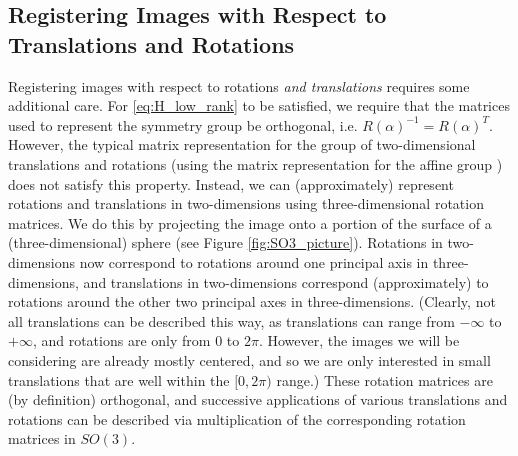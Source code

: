 \documentclass{pnastwo}
\begin{document}
\begin{article}
\begin{materials}
\section{Registering Images with Respect to Translations and Rotations} \label{subsec:trans_rot_register}

Registering images with respect to rotations {\em and translations} requires some additional care.
%
%
For \eqref{eq:H_low_rank} to be satisfied, we require that the matrices used to represent the symmetry group be orthogonal, i.e. $R(\alpha)^{-1} = R(\alpha)^T$. 
%
However, the typical matrix representation for the group of two-dimensional translations and rotations (using the matrix representation for the affine group \cite{...}) does not satisfy this property. 
%
Instead, we can (approximately) represent rotations and translations in two-dimensions using three-dimensional rotation matrices.
%
We do this by projecting the image onto a portion of the surface of a (three-dimensional) sphere (see Figure \ref{fig:SO3_picture}).
%
Rotations in two-dimensions now correspond to rotations around one principal axis in three-dimensions, and translations in two-dimensions correspond (approximately) to rotations around the other two principal axes in three-dimensions. (Clearly, not all translations can be described this way, as translations can range from $-\infty$ to $+ \infty$, and rotations are only from $0$ to $2 \pi$. However, the images we will be considering are already mostly centered, and so we are only interested in small translations that are well within the $[0, 2\pi)$ range.)
%
These rotation matrices are (by definition) orthogonal, and successive applications of various translations and rotations can be described via multiplication of the corresponding rotation matrices in $SO(3)$.


\end{materials}
\end{article}
\end{document}
